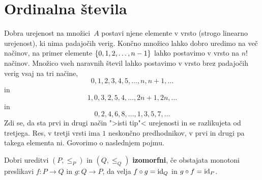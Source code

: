 \section{Ordinalna števila}
\label{sec:ordinalna-tevila}

Dobra urejenost na množici~$A$ postavi njene elemente v vrsto (strogo linearno urejenost), ki nima padajočih verig.
Končno množico lahko dobro uredimo na več načinov, na primer elemente $\set{0, 1, 2, \ldots, n-1}$ lahko postavimo v vrsto na $n!$ načinov. Množico vseh naravnih števil lahko postavimo v vrsto brez padajočih verig vsaj na tri načine,
%
\begin{equation*}
  0, 1, 2, 3, 4, 5, \ldots, n, n + 1, \ldots
\end{equation*}
%
in
%
\begin{equation*}
  1, 0, 3, 2, 5, 4, \ldots, 2 n + 1, 2 n, \ldots
\end{equation*}
%
in
%
\begin{equation*}
  0, 2, 4, 6, 8, \ldots, 1, 3, 5, 7, \ldots
\end{equation*}
%
Zdi se, da sta prvi in drugi način ">isti tip"< urejenosti in se razlikujeta od tretjega. Res, v tretji vrsti ima $1$ neskončno predhodnikov, v prvi in drugi pa takega elementa ni. Govorimo o naslednjem pojmu.

\begin{definicija}
  Dobri ureditvi $(P, {\leq_P})$ in $(Q, {\leq_Q})$ \textbf{izomorfni}, če obstajata monotoni preslikavi $f : P \to Q$ in $g : Q \to P$, da velja $f \circ g = \id[Q]$ in $g \circ f = \id[P]$.
\end{definicija}

